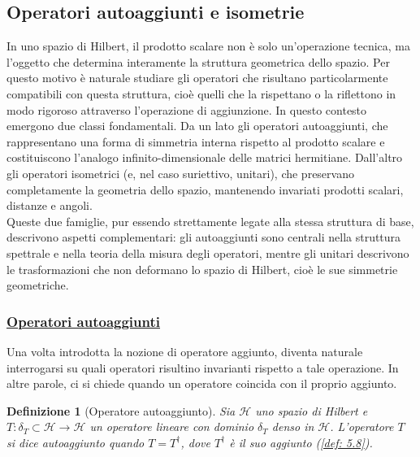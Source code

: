 \documentclass[a4paper,12pt]{report}
\newtheorem{definizione}{Definizione}[chapter]
\begin{document}
\newpage

\subsection{Operatori autoaggiunti e isometrie}

In uno spazio di Hilbert, il prodotto scalare non è solo un’operazione tecnica, ma l’oggetto che determina interamente la struttura geometrica dello spazio. Per questo motivo è naturale studiare gli operatori che risultano particolarmente compatibili con questa struttura, cioè quelli che la rispettano o la riflettono in modo rigoroso attraverso l’operazione di aggiunzione. In questo contesto emergono due classi fondamentali. Da un lato gli operatori autoaggiunti, che rappresentano una forma di simmetria interna rispetto al prodotto scalare e costituiscono l’analogo infinito-dimensionale delle matrici hermitiane. Dall’altro gli operatori isometrici (e, nel caso suriettivo, unitari), che preservano completamente la geometria dello spazio, mantenendo invariati prodotti scalari, distanze e angoli.
\\Queste due famiglie, pur essendo strettamente legate alla stessa struttura di base, descrivono aspetti complementari: gli autoaggiunti sono centrali nella struttura spettrale e nella teoria della misura degli operatori, mentre gli unitari descrivono le trasformazioni che non deformano lo spazio di Hilbert, cioè le sue simmetrie geometriche.

\subsubsection{\underline{Operatori autoaggiunti}}

Una volta introdotta la nozione di operatore aggiunto, diventa naturale interrogarsi su quali operatori risultino invarianti rispetto a tale operazione. In altre parole, ci si chiede quando un operatore coincida con il proprio aggiunto.

\begin{definizione}[Operatore autoaggiunto]\label{def: 5.9}
    Sia $\mathscr{H}$ uno spazio di Hilbert e \mbox{$T: \delta_T\subset \mathscr{H}\to \mathscr{H}$} un operatore lineare con dominio $\delta_T$ denso in $\mathscr{H}$. L'operatore $T$ si dice autoaggiunto quando $T=T^\dagger$, dove $T^\dagger$ è il suo aggiunto (\ref{def: 5.8}).
\end{definizione}
\end{document}
